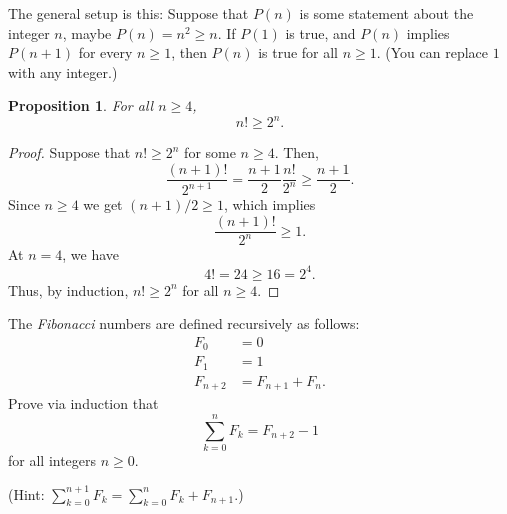 \documentclass[12pt]{article}
\newtheorem{proposition}{Proposition}
\theoremstyle{definition}
\begin{document}
The general setup is this: Suppose that $P(n)$ is some statement about the
integer $n$, maybe $P(n) = n^2 \geq n$. If $P(1)$ is true, and $P(n)$ implies
$P(n + 1)$ for every $n \geq 1$, then $P(n)$ is true for all $n \geq 1$. (You
can replace $1$ with any integer.)

\begin{proposition}
    For all $n \geq 4$,
    \begin{equation*}
        n! \geq 2^n.
    \end{equation*}
\end{proposition}

\begin{proof}
    Suppose that $n! \geq 2^n$ for some $n \geq 4$. Then,
    \begin{equation*}
        \frac{(n + 1)!}{2^{n + 1}} = \frac{n + 1}{2} \frac{n!}{2^n} \geq \frac{n + 1}{2}.
    \end{equation*}
    Since $n \geq 4$ we get $(n + 1) / 2 \geq 1$, which implies
    \begin{equation*}
        \frac{(n + 1)!}{2^n} \geq 1.
    \end{equation*}
    At $n = 4$, we have
    \begin{equation*}
        4! = 24 \geq 16 = 2^4.
    \end{equation*}
    Thus, by induction, $n! \geq 2^n$ for all $n \geq 4$.
\end{proof}

\begin{Exercise}
    The \emph{Fibonacci} numbers are defined recursively as follows:
    \begin{align*}
        F_0 &= 0 \\
        F_1 &= 1 \\
        F_{n + 2} &= F_{n + 1} + F_n.
    \end{align*}
    Prove via induction that
    \begin{equation*}
        \sum_{k = 0}^n F_k = F_{n + 2} - 1
    \end{equation*}
    for all integers $n \geq 0$.

    (Hint: $\sum_{k = 0}^{n + 1} F_k = \sum_{k = 0}^n F_k + F_{n + 1}$.)
\end{Exercise}
\end{document}
